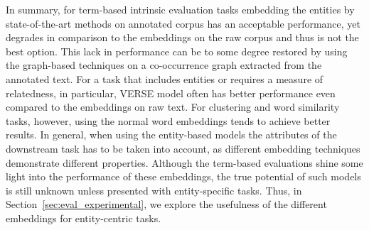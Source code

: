 In summary, for term-based intrinsic evaluation tasks embedding the entities by state-of-the-art methods on annotated corpus has an acceptable performance, yet degrades in comparison to the embeddings on the raw corpus and thus is not the best option. This lack in performance can be to some degree restored by using the graph-based techniques on a co-occurrence graph extracted from the annotated text. For a task that includes entities or requires a measure of relatedness, in particular, VERSE model often has better performance even compared to the embeddings on raw text. For clustering and word similarity tasks, however, using the normal word embeddings tends to achieve better results. In general, when using the entity-based models the attributes of the downstream task has to be taken into account, as different embedding techniques demonstrate different properties. Although the term-based evaluations shine some light into the performance of these embeddings, the true potential of such models is still unknown unless presented with entity-specific tasks. Thus, in Section~\ref{sec:eval_experimental}, we explore the usefulness of the different embeddings for entity-centric tasks.
